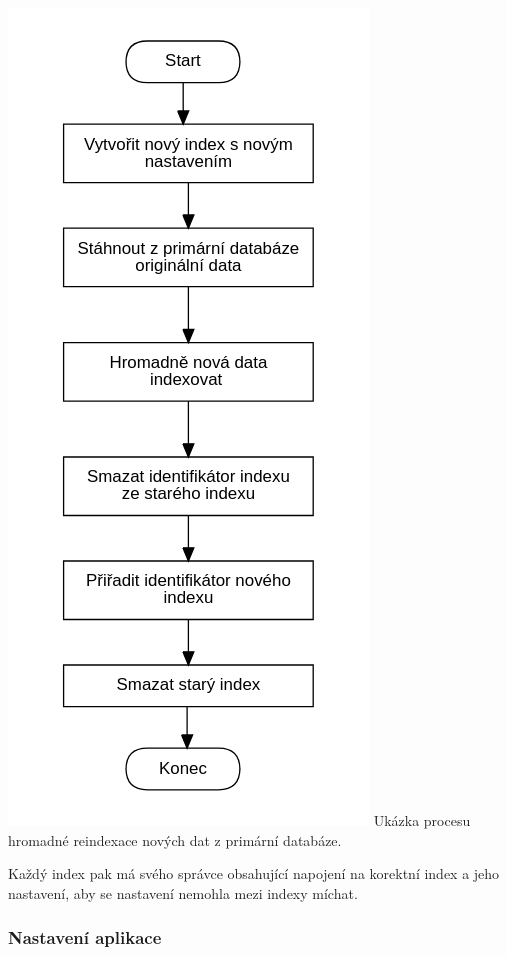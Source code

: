 \begin{itemize}
\begin{itemize}
		\includegraphics{obrazky/proces_reindexace_z_db}\hfill
		Ukázka procesu hromadné reindexace nových dat z primární databáze. %

		Každý index pak má svého správce obsahující napojení na korektní index a jeho nastavení, aby se nastavení nemohla
		mezi indexy míchat.

		\subsubsection{Nastavení aplikace}


\end{itemize}
\end{itemize}
